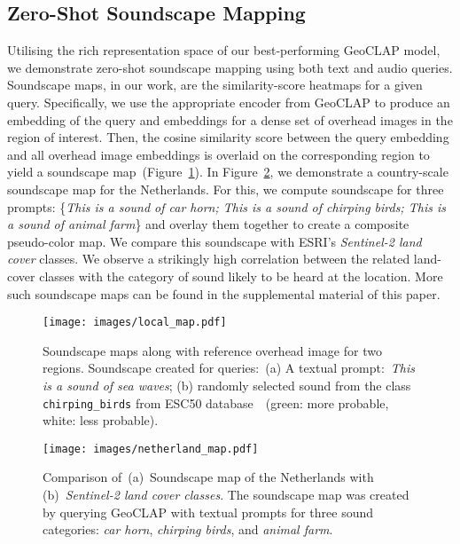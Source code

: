 \documentclass{bmvc2k}
\begin{document}
\subsection{Zero-Shot Soundscape Mapping}
Utilising the rich representation space of our best-performing GeoCLAP model, we demonstrate zero-shot soundscape mapping using both text and audio queries. Soundscape maps, in our work, are the similarity-score heatmaps for a given query. 
Specifically, we use the appropriate encoder from GeoCLAP to produce an embedding of the query and embeddings for a dense set of overhead images in the region of interest.
Then, the cosine similarity score between the query embedding and all overhead image embeddings is overlaid on the corresponding region to yield a soundscape map~(Figure~\ref{fig:small_regions}). In Figure~\ref{fig:netherlands}, we demonstrate a country-scale soundscape map for the Netherlands. For this, we compute soundscape for three prompts: \{\textit{This is a sound of car horn; This is a sound of chirping birds; This is a sound of animal farm}\} and overlay them together to create a composite pseudo-color map. We compare this soundscape with ESRI's \textit{Sentinel-2 land cover} classes. We observe a strikingly high correlation between the related land-cover classes with the category of sound likely to be heard at the location. More such soundscape maps can be found in the supplemental material of this paper.
\begin{figure}[!ht]
    \centering
    \texttt{[image: images/local\_map.pdf]}
    \caption{Soundscape maps along with reference overhead image for two regions. Soundscape created for queries:~(a) A textual prompt:~\textit{This is a sound of sea waves}; (b) randomly selected sound from the class \texttt{chirping\_birds} from ESC50 database~\cite{piczak2015dataset}~(green: more probable, white: less probable).}
    \label{fig:small_regions}
\end{figure}

\begin{figure}[!ht]
    \centering
    \texttt{[image: images/netherland\_map.pdf]}
    \caption{Comparison of~(a)~Soundscape map of the Netherlands with (b)~\textit{Sentinel-2 land cover classes}. The soundscape map was created by querying GeoCLAP with textual prompts for three sound categories: \textit{car horn}, \textit{chirping birds}, and \textit{animal farm}.}
    \label{fig:netherlands}
\end{figure}
\end{document}
